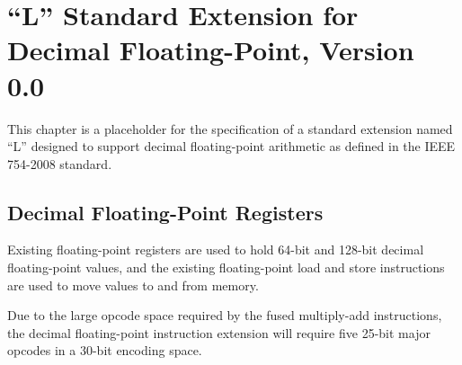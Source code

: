 \chapter{``L'' Standard Extension for Decimal Floating-Point, Version 0.0}

This chapter is a placeholder for the specification of a standard
extension named ``L'' designed to support decimal floating-point
arithmetic as defined in the IEEE 754-2008 standard.

\section{Decimal Floating-Point Registers}

Existing floating-point registers are used to hold 64-bit and 128-bit
decimal floating-point values, and the existing floating-point load
and store instructions are used to move values to and from memory.

\begin{commentary}
Due to the large opcode space required by the fused multiply-add
instructions, the decimal floating-point instruction extension will
require five 25-bit major opcodes in a 30-bit encoding space.
\end{commentary}
